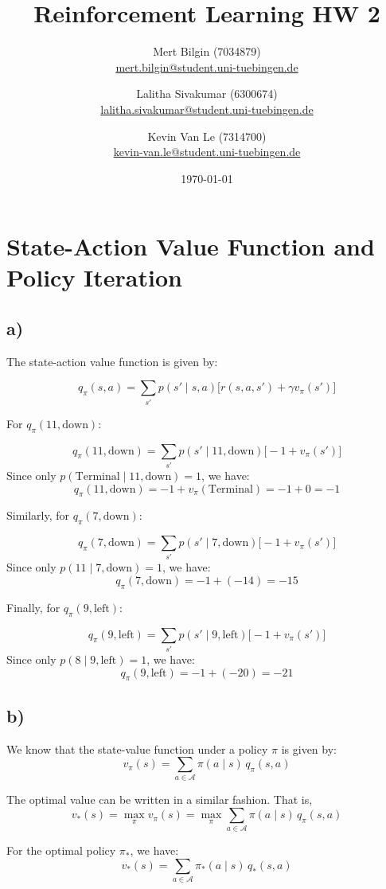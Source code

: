 \documentclass[11pt]{article}
\title{Reinforcement Learning HW 2}
\author{
Mert Bilgin (7034879) \\
\url{mert.bilgin@student.uni-tuebingen.de}
\and
Lalitha Sivakumar (6300674) \\
\url{lalitha.sivakumar@student.uni-tuebingen.de}
\and
Kevin Van Le (7314700) \\
\url{kevin-van.le@student.uni-tuebingen.de}
}
\date{\today}
\begin{document}
\maketitle

\section{State-Action Value Function and Policy Iteration}

\subsection*{a)}
The state-action value function is given by:

\[
q_{\pi}(s, a) = \sum_{s'} p(s' \mid s, a) \big[ r(s, a, s') + \gamma v_{\pi}(s') \big]
\]


\noindent For \( q_{\pi}(11, \text{down}) \):

\[
q_{\pi}(11, \text{down}) 
= \sum_{s'} p(s' \mid 11, \text{down}) \big[ -1 + v_{\pi}(s') \big]
\]
Since only \( p(\text{Terminal} \mid 11, \text{down}) = 1 \), we have:
\[
q_{\pi}(11, \text{down}) = -1 + v_{\pi}(\text{Terminal}) = -1 + 0 = -1
\]


\noindent Similarly, for \( q_{\pi}(7, \text{down}) \):

\[
q_{\pi}(7, \text{down}) 
= \sum_{s'} p(s' \mid 7, \text{down}) \big[ -1 + v_{\pi}(s') \big]
\]
Since only \( p(11 \mid 7, \text{down}) = 1 \), we have:
\[
q_{\pi}(7, \text{down}) = -1 + (-14) = -15
\]


\noindent Finally, for \( q_{\pi}(9, \text{left}) \):

\[
q_{\pi}(9, \text{left}) 
= \sum_{s'} p(s' \mid 9, \text{left}) \big[ -1 + v_{\pi}(s') \big]
\]
Since only \( p(8 \mid 9, \text{left}) = 1 \), we have:
\[
q_{\pi}(9, \text{left}) = -1 + (-20) = -21
\]

\subsection*{b)}

We know that the state-value function under a policy $\pi$ is given by:
\[
v_{\pi}(s) = \sum_{a \in \mathcal{A}} \pi(a \mid s) \, q_{\pi}(s, a)
\]

The optimal value can be written in a similar fashion. That is,
\[
v_{*}(s) = \max_{\pi} v_{\pi}(s)
          = \max_{\pi} \sum_{a \in \mathcal{A}} \pi(a \mid s) \, q_{\pi}(s, a)
\]

For the optimal policy $\pi_{*}$, we have:
\[
v_{*}(s) = \sum_{a \in \mathcal{A}} \pi_{*}(a \mid s) \, q_{*}(s, a)
\]
\end{document}
